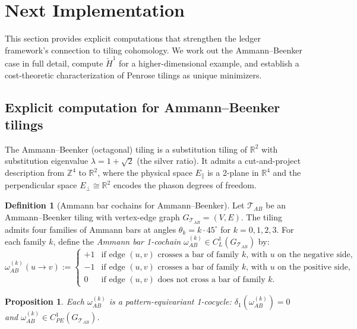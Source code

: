 \documentclass[12pt]{article}
\newtheorem{proposition}[theorem]{Proposition}
\theoremstyle{definition}
\newtheorem{definition}[theorem]{Definition}
\theoremstyle{remark}
\newcommand{\RR}{\mathbb{R}}
\newcommand{\ZZ}{\mathbb{Z}}
\begin{document}
\section{Next Implementation}
\label{sec:next-implementation}

This section provides explicit computations that strengthen the ledger framework's connection to tiling cohomology. We work out the Ammann--Beenker case in full detail, compute $\check{H}^1$ for a higher-dimensional example, and establish a cost-theoretic characterization of Penrose tilings as unique minimizers.

\subsection{Explicit computation for Ammann--Beenker tilings}

The Ammann--Beenker (octagonal) tiling is a substitution tiling of $\RR^2$ with substitution eigenvalue $\lambda = 1 + \sqrt{2}$ (the silver ratio). It admits a cut-and-project description from $\ZZ^4$ to $\RR^2$, where the physical space $E_\parallel$ is a 2-plane in $\RR^4$ and the perpendicular space $E_\perp \cong \RR^2$ encodes the phason degrees of freedom.

\begin{definition}[Ammann bar cochains for Ammann--Beenker]
\label{def:AB-bars}
Let $\mathcal{T}_{AB}$ be an Ammann--Beenker tiling with vertex-edge graph $G_{\mathcal{T}_{AB}} = (V, E)$. The tiling admits four families of Ammann bars at angles $\theta_k = k \cdot 45^\circ$ for $k = 0, 1, 2, 3$. For each family $k$, define the \emph{Ammann bar 1-cochain} $\omega_{AB}^{(k)} \in C^1_L(G_{\mathcal{T}_{AB}})$ by:
\begin{equation}
\omega_{AB}^{(k)}(u \to v) := \begin{cases}
+1 & \text{if edge $(u,v)$ crosses a bar of family $k$, with $u$ on the negative side}, \\
-1 & \text{if edge $(u,v)$ crosses a bar of family $k$, with $u$ on the positive side}, \\
0 & \text{if edge $(u,v)$ does not cross a bar of family $k$}.
\end{cases}
\label{eq:AB-cochain}
\end{equation}
\end{definition}

\begin{proposition}
\label{prop:AB-cocycle}
Each $\omega_{AB}^{(k)}$ is a pattern-equivariant 1-cocycle: $\delta_1(\omega_{AB}^{(k)}) = 0$ and $\omega_{AB}^{(k)} \in C^1_{PE}(G_{\mathcal{T}_{AB}})$.
\end{proposition}
\end{document}
